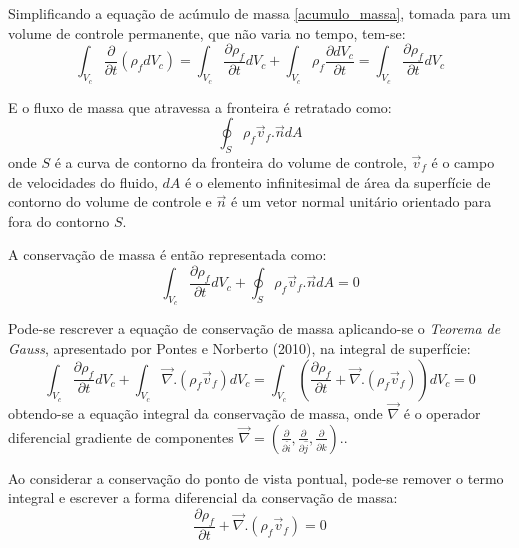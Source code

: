 Simplificando a equação de acúmulo de massa \eqref{acumulo_massa}, tomada para um volume de controle permanente, que não varia no tempo, tem-se:
\begin{equation}
    \int_{V_c}\dfrac{\partial}{\partial t} (\rho_f d V_c) = \int_{V_c}\dfrac{\partial \rho_f}{\partial t} d V_c + \int_{V_c} \rho_f \dfrac{\partial d V_c}{\partial t} = \int_{V_c}\dfrac{\partial \rho_f}{\partial t} d V_c
    \label{acumulo_massa_simp}
\end{equation}

E o fluxo de massa que atravessa a fronteira é retratado como:
\begin{equation}
    \oint_{S}\rho_f \vec{v}_f.\vec{n} dA
    \label{fluxo_massa}
\end{equation}
onde $S$ é a curva de contorno da fronteira do volume de controle, $\vec{v}_f$ é o campo de velocidades do fluido, $dA$ é o elemento infinitesimal de área da superfície de contorno do volume de controle e $\vec{n}$ é um vetor normal unitário orientado para fora do contorno $S$.

A conservação de massa é então representada como:
\begin{equation}
    \int_{V_c}\dfrac{\partial \rho_f}{\partial t} d V_c + \oint_{S}\rho_f \vec{v}_f.\vec{n} dA = 0
    \label{cons_mass}
\end{equation}

Pode-se rescrever a equação de conservação de massa aplicando-se o \textit{Teorema de Gauss}, apresentado por Pontes e Norberto (2010)\cite{pontes_norberto}, na integral de superfície:
\begin{equation}
    \int_{V_c}\dfrac{\partial \rho_f}{\partial t} d V_c + \int_{V_c}\vec{\nabla}.(\rho_f \vec{v}_f) d V_c = 
    \int_{V_c}\left(\dfrac{\partial \rho_f}{\partial t} + \vec{\nabla}.(\rho_f \vec{v}_f) \right)d V_c = 0
    \label{cons_mass_int}
\end{equation}
obtendo-se a equação integral da conservação de massa, onde $\vec{\nabla}$ é o operador diferencial gradiente de componentes $\vec{\nabla}=\left(\tfrac{\partial}{\partial \hat{i}}, \tfrac{\partial}{\partial \hat{j}}, \tfrac{\partial}{\partial \hat{k}}\right)$..

Ao considerar a conservação do ponto de vista pontual, pode-se remover o termo integral e escrever a forma diferencial da conservação de massa:
\begin{equation}
    \dfrac{\partial \rho_f}{\partial t} + \vec{\nabla}.(\rho_f \vec{v}_f) = 0
    \label{cons_mass_dif}
\end{equation}


